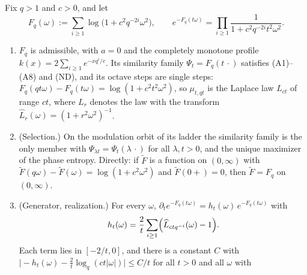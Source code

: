 \begin{theorem}
\label{thm:matern-pyramid-line}
\leanok
{}
Fix $q > 1$ and $c > 0$, and let
\begin{equation}\label{eq:line-e7}
  F_q(\omega) := \sum_{i \ge 1}\log\bigl(1 + c^2q^{-2i}\omega^2\bigr), \qquad
  e^{-F_q(t\omega)} = \prod_{i \ge 1}\frac{1}{1 + c^2q^{-2i}t^2\omega^2}.
\end{equation}
\begin{enumerate}
\item $F_q$ is admissible, with $a = 0$ and the completely monotone profile
$k(x) = 2\sum_{i \ge 1}e^{-xq^i/c}$. Its similarity family $\Psi_t = F_q(t\,\cdot)$ satisfies
(A1)--(A8) and (ND), and its octave steps are single \Matern{} steps:
$F_q(qt\omega) - F_q(t\omega) = \log(1 + c^2t^2\omega^2)$, so $\mu_{t,qt}$ is the Laplace law
$L_{ct}$ of range $ct$, where $L_r$ denotes the law with the transform
$\widehat L_r(\omega) = (1 + r^2\omega^2)^{-1}$.
\item (Selection.) On the modulation orbit of its ladder the similarity family is the only member
with $\Psi_{\lambda t} = \Psi_t(\lambda\,\cdot)$ for all $\lambda, t > 0$, and the unique maximizer of
the phase entropy. Directly: if $\tilde F$ is a function on $(0,\infty)$ with
$\tilde F(q\omega) - \tilde F(\omega) = \log(1 + c^2\omega^2)$ and $\tilde F(0{+}) = 0$, then
$\tilde F = F_q$ on $(0,\infty)$.
\item (Generator, realization.) For every $\omega$,
$\partial_te^{-F_q(t\omega)} = h_t(\omega)\,e^{-F_q(t\omega)}$ with
\[
  h_t(\omega) = \frac2t\sum_{i \ge 1}\Bigl(\widehat L_{ctq^{-i}}(\omega) - 1\Bigr).
\]
Each term lies in $[-2/t, 0]$, and there is a constant $C$ with
$\bigl|-h_t(\omega) - \tfrac2t\log_q(ct|\omega|)\bigr| \le C/t$ for all $t > 0$ and all $\omega$ with

\end{enumerate}
\end{theorem}
